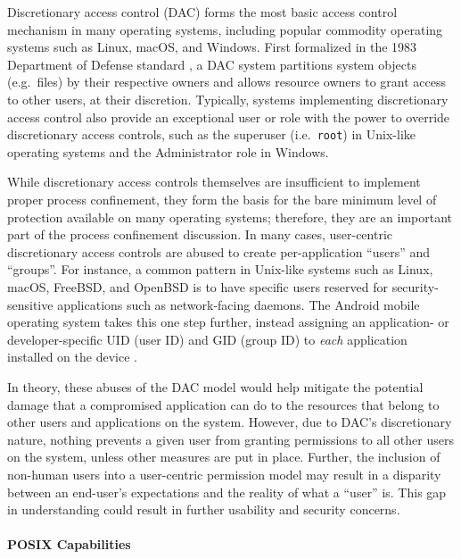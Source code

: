 Discretionary access control (DAC) forms the most basic access control mechanism in many operating systems, including popular commodity operating systems such as Linux, macOS, and Windows.  First formalized in the 1983 Department of Defense standard \cite{orange_book}, a DAC system partitions system objects (e.g.~files) by their respective owners and allows resource owners to grant access to other users, at their discretion.  Typically, systems implementing discretionary access control also provide an exceptional user or role with the power to override discretionary access controls, such as the superuser (i.e.~\texttt{root}) in Unix-like operating systems and the Administrator role in Windows.

While discretionary access controls themselves are insufficient to implement proper process confinement, they form the basis for the bare minimum level of protection available on many operating systems; therefore, they are an important part of the process confinement discussion. In many cases, user-centric discretionary access controls are abused to create per-application \enquote{users} and \enquote{groups}. For instance, a common pattern in Unix-like systems such as Linux, macOS, FreeBSD, and OpenBSD is to have specific users reserved for security-sensitive applications such as network-facing daemons. The Android mobile operating system takes this one step further, instead assigning an application- or developer-specific UID (user ID) and GID (group ID) to \textit{each} application installed on the device \cite{android_security}.

In theory, these abuses of the DAC model would help mitigate the potential damage that a compromised application can do to the resources that belong to other users and applications on the system. However, due to DAC's discretionary nature, nothing prevents a given user from granting permissions to all other users on the system, unless other measures are put in place. Further, the inclusion of non-human users into a user-centric permission model may result in a disparity between an end-user's expectations and the reality of what a \enquote{user} is. This gap in understanding could result in further usability and security concerns.

\paragraph*{POSIX Capabilities}

